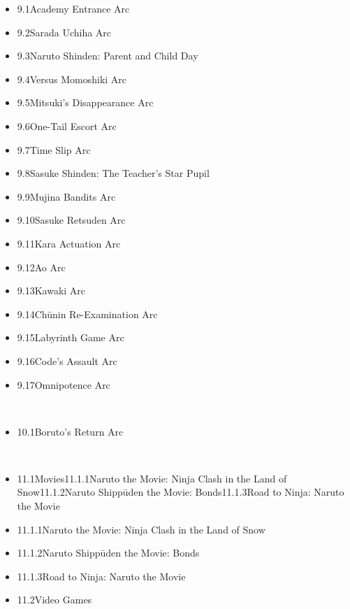 \documentclass[a4paper,12pt]{article}
\begin{document}
\begin{itemize}
\item 9.1Academy Entrance Arc
\item 9.2Sarada Uchiha Arc
\item 9.3Naruto Shinden: Parent and Child Day
\item 9.4Versus Momoshiki Arc
\item 9.5Mitsuki's Disappearance Arc
\item 9.6One-Tail Escort Arc
\item 9.7Time Slip Arc
\item 9.8Sasuke Shinden: The Teacher's Star Pupil
\item 9.9Mujina Bandits Arc
\item 9.10Sasuke Retsuden Arc
\item 9.11Kara Actuation Arc
\item 9.12Ao Arc
\item 9.13Kawaki Arc
\item 9.14Chūnin Re-Examination Arc
\item 9.15Labyrinth Game Arc
\item 9.16Code's Assault Arc
\item 9.17Omnipotence Arc
\end{itemize}\\ \par \vspace{0.5cm}

\begin{itemize}
\item 10.1Boruto's Return Arc
\end{itemize}\\ \par \vspace{0.5cm}

\begin{itemize}
\item 11.1Movies11.1.1Naruto the Movie: Ninja Clash in the Land of Snow11.1.2Naruto Shippūden the Movie: Bonds11.1.3Road to Ninja: Naruto the Movie
\item 11.1.1Naruto the Movie: Ninja Clash in the Land of Snow
\item 11.1.2Naruto Shippūden the Movie: Bonds
\item 11.1.3Road to Ninja: Naruto the Movie
\item 11.2Video Games
\end{itemize}\\ \par \vspace{0.5cm}
\end{document}
